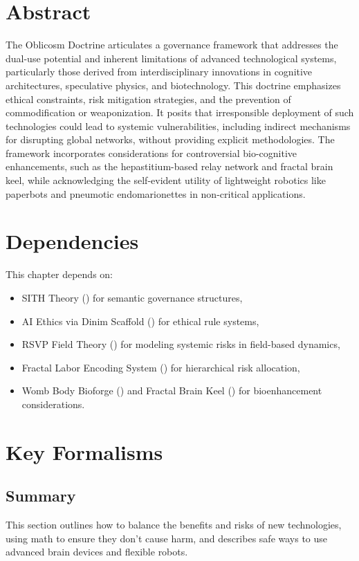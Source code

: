 \documentclass[11pt,oneside]{memoir}
\theoremstyle{plain}
\begin{document}
\section{Abstract}
The Oblicosm Doctrine articulates a governance framework that addresses the dual-use potential and inherent limitations of advanced technological systems, particularly those derived from interdisciplinary innovations in cognitive architectures, speculative physics, and biotechnology. This doctrine emphasizes ethical constraints, risk mitigation strategies, and the prevention of commodification or weaponization. It posits that irresponsible deployment of such technologies could lead to systemic vulnerabilities, including indirect mechanisms for disrupting global networks, without providing explicit methodologies. The framework incorporates considerations for controversial bio-cognitive enhancements, such as the hepastitium-based relay network and fractal brain keel, while acknowledging the self-evident utility of lightweight robotics like paperbots and pneumotic endomarionettes in non-critical applications.

\section{Dependencies}
This chapter depends on:
\begin{itemize}
    \item SITH Theory () for semantic governance structures,
    \item AI Ethics via Dinim Scaffold () for ethical rule systems,
    \item RSVP Field Theory () for modeling systemic risks in field-based dynamics,
    \item Fractal Labor Encoding System () for hierarchical risk allocation,
    \item Womb Body Bioforge () and Fractal Brain Keel () for bioenhancement considerations.
\end{itemize}

\section{Key Formalisms}
\subsection{Summary}
This section outlines how to balance the benefits and risks of new technologies, using math to ensure they don’t cause harm, and describes safe ways to use advanced brain devices and flexible robots.
\end{document}
